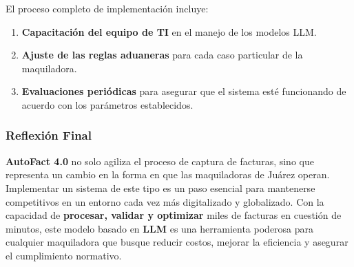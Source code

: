 \documentclass[
  10pt,
  letterpaper,
]{book}
\providecommand{\tightlist}{%
  \setlength{\itemsep}{0pt}\setlength{\parskip}{0pt}}\usepackage{longtable,booktabs,array}
\begin{document}
El proceso completo de implementación incluye:

\begin{enumerate}
\def\labelenumi{\arabic{enumi}.}
\tightlist
\item
  \textbf{Capacitación del equipo de TI} en el manejo de los modelos
  LLM.
\item
  \textbf{Ajuste de las reglas aduaneras} para cada caso particular de
  la maquiladora.
\item
  \textbf{Evaluaciones periódicas} para asegurar que el sistema esté
  funcionando de acuerdo con los parámetros establecidos.
\end{enumerate}

\subsubsection{Reflexión Final}\label{reflexiuxf3n-final-2}

\textbf{AutoFact 4.0} no solo agiliza el proceso de captura de facturas,
sino que representa un cambio en la forma en que las maquiladoras de
Juárez operan. Implementar un sistema de este tipo es un paso esencial
para mantenerse competitivos en un entorno cada vez más digitalizado y
globalizado. Con la capacidad de \textbf{procesar, validar y optimizar}
miles de facturas en cuestión de minutos, este modelo basado en
\textbf{LLM} es una herramienta poderosa para cualquier maquiladora que
busque reducir costos, mejorar la eficiencia y asegurar el cumplimiento
normativo.
\end{document}
